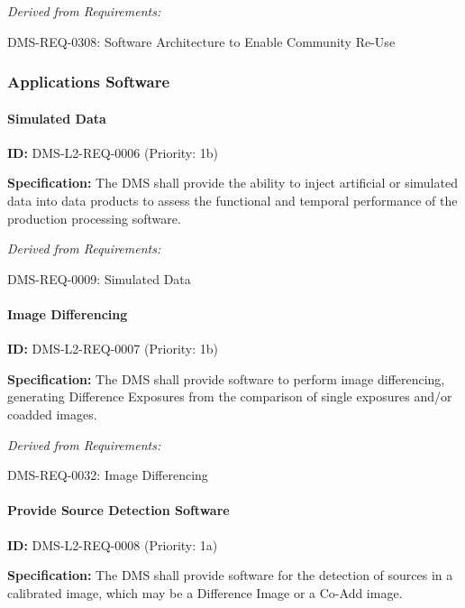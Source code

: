 \documentclass[SE,toc,lsstdraft]{lsstdoc}
\begin{document}
\emph{Derived from Requirements:}

DMS-REQ-0308:
Software Architecture to Enable Community Re-Use \newline

\subsubsection{Applications Software}

\paragraph{Simulated Data}\hfill  %

\label{DMS-L2-REQ-0006}
\textbf{ID:} DMS-L2-REQ-0006 (Priority: 1b)

\textbf{Specification:} The DMS shall provide the ability to inject artificial or simulated data into data products to assess the functional and temporal performance of the production processing software.

\emph{Derived from Requirements:}

DMS-REQ-0009:
Simulated Data \newline

\paragraph{Image Differencing}\hfill  %

\label{DMS-L2-REQ-0007}
\textbf{ID:} DMS-L2-REQ-0007 (Priority: 1b)

\textbf{Specification:} The DMS shall provide software to perform image differencing, generating Difference Exposures from the comparison of single exposures and/or coadded images.

\emph{Derived from Requirements:}

DMS-REQ-0032:
Image Differencing \newline

\paragraph{Provide Source Detection Software}\hfill  %

\label{DMS-L2-REQ-0008}
\textbf{ID:} DMS-L2-REQ-0008 (Priority: 1a)

\textbf{Specification:} The DMS shall provide software for the detection of sources in a calibrated image, which may be a Difference Image or a Co-Add image.
\end{document}
